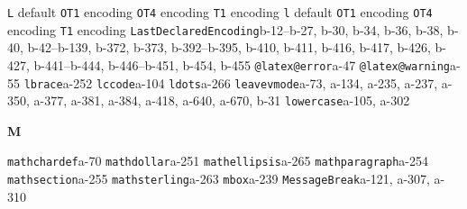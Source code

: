 \documentclass[twoside]{ltxdoc}
\makeatletter
\renewenvironment{theindex}{%
   \@restonecoltrue
   \if@twocolumn\@restonecolfalse\fi
   \columnseprule \z@
   \columnsep 35\p@
   \twocolumn[\index@prologue]%
   \IndexParms
   \let\item\@idxitem
   \ignorespaces
}{\if@restonecol\onecolumn\else\clearpage\fi}
\makeatother
\begin{document}
\begin{theindex}
  \item \texttt  {L}\efill 
    \subitem default\pfill {}
    \subitem \texttt  {OT1} encoding\pfill {}
    \subitem \texttt  {OT4} encoding\pfill {}
    \subitem \texttt  {T1} encoding\pfill {}
  \item \texttt  {l}\efill 
    \subitem default\pfill {}
    \subitem \texttt  {OT1} encoding\pfill {}
    \subitem \texttt  {OT4} encoding\pfill {}
    \subitem \texttt  {T1} encoding\pfill {}
  \item \texttt  {LastDeclaredEncoding}\pfill b-12--b-27, 
                b-30, b-34, b-36, b-38, b-40, b-42--b-139, 
                b-372, b-373, b-392--b-395, b-410, b-411, b-416, b-417, 
                b-426, b-427, b-441--b-444, b-446--b-451, b-454, b-455
  \item \texttt  {@latex@error}\pfill a-47
  \item \texttt  {@latex@warning}\pfill a-55
  \item \texttt  {lbrace}\pfill a-252
  \item \texttt  {lccode}\pfill a-104
  \item \texttt  {ldots}\pfill a-266
  \item \texttt  {leavevmode}\pfill a-73, a-134, a-235, 
                a-237, a-350, a-377, a-381, a-384, a-418, a-640, a-670, 
                b-31
  \item \texttt  {lowercase}\pfill a-105, a-302

  \indexspace
{\bfseries\hfil M\hfil}\nopagebreak

  \item \texttt  {mathchardef}\pfill a-70
  \item \texttt  {mathdollar}\pfill a-251
  \item \texttt  {mathellipsis}\pfill a-265
  \item \texttt  {mathparagraph}\pfill a-254
  \item \texttt  {mathsection}\pfill a-255
  \item \texttt  {mathsterling}\pfill a-263
  \item \texttt  {mbox}\pfill a-239
  \item \texttt  {MessageBreak}\pfill a-121, a-307, 
                a-310


\end{theindex}
\end{document}
